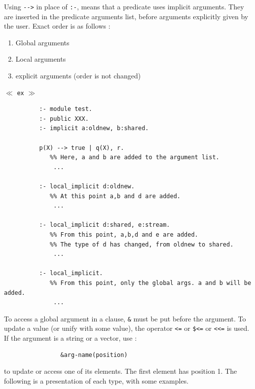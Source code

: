 Using \verb|-->|\index{\verb|-->|} in place of \verb|:-|,
means that a predicate uses implicit arguments.
They are inserted in the predicate arguments list, before
arguments explicitly given by the user. Exact order is as follows :
\begin{enumerate}
\item Global arguments
\item Local arguments
\item explicit arguments (order is not changed)
\end{enumerate}
$\ll$ \verb|ex| $\gg$\\
\begin{verbatim}
          :- module test.
          :- public XXX.
          :- implicit a:oldnew, b:shared.

          p(X) --> true | q(X), r.
             %% Here, a and b are added to the argument list.
              ...

          :- local_implicit d:oldnew.
             %% At this point a,b and d are added.
              ...

          :- local_implicit d:shared, e:stream.
             %% From this point, a,b,d and e are added.
             %% The type of d has changed, from oldnew to shared.
              ...

          :- local_implicit.
             %% From this point, only the global args. a and b will be added.
              ...

\end{verbatim}

To access a global argument in a clause, \verb|&|\index{\verb|&|}
must be put before the argument. To update a value (or unify with some value),
the operator \verb|<=| or \verb|$<=| or \verb|<<=| is used.
\index{\verb|<=|} \index{\verb|$<=|} \index{\verb|<<=|}
If the argument is a string or a vector, use :
\begin{verbatim}
                &arg-name(position)
\end{verbatim}
to update or access one of its elements. The first element has position 1.
The following is a presentation of each type, with some examples.
\vspace{1ex}

